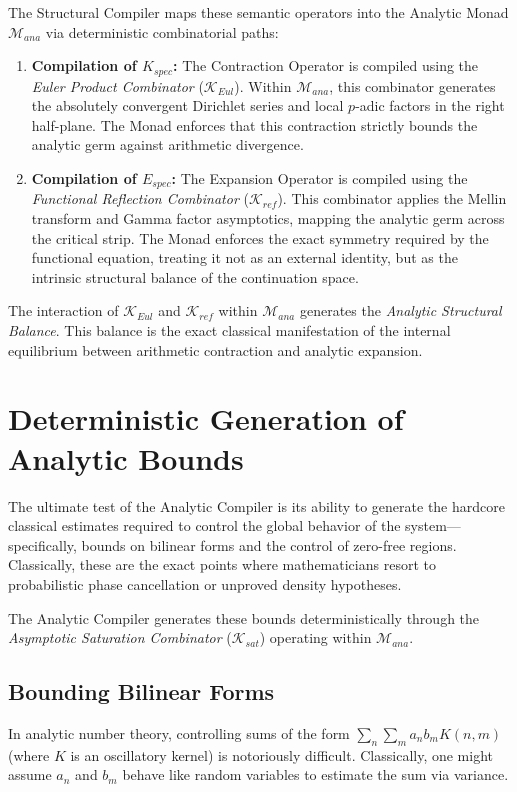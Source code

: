 \documentclass[12pt,openany]{extbook}
\theoremstyle{plain}
\theoremstyle{definition}
\begin{document}
The Structural Compiler maps these semantic operators into the Analytic Monad $\mathcal{M}_{ana}$ via deterministic combinatorial paths:

\begin{enumerate}
    \item \textbf{Compilation of $K_{spec}$:} The Contraction Operator is compiled using the \emph{Euler Product Combinator} ($\mathcal{K}_{Eul}$). Within $\mathcal{M}_{ana}$, this combinator generates the absolutely convergent Dirichlet series and local $p$-adic factors in the right half-plane. The Monad enforces that this contraction strictly bounds the analytic germ against arithmetic divergence.
    \item \textbf{Compilation of $E_{spec}$:} The Expansion Operator is compiled using the \emph{Functional Reflection Combinator} ($\mathcal{K}_{ref}$). This combinator applies the Mellin transform and Gamma factor asymptotics, mapping the analytic germ across the critical strip. The Monad enforces the exact symmetry required by the functional equation, treating it not as an external identity, but as the intrinsic structural balance of the continuation space.
\end{enumerate}

The interaction of $\mathcal{K}_{Eul}$ and $\mathcal{K}_{ref}$ within $\mathcal{M}_{ana}$ generates the \emph{Analytic Structural Balance}. This balance is the exact classical manifestation of the internal equilibrium between arithmetic contraction and analytic expansion.

\section{Deterministic Generation of Analytic Bounds}

The ultimate test of the Analytic Compiler is its ability to generate the hardcore classical estimates required to control the global behavior of the system—specifically, bounds on bilinear forms and the control of zero-free regions. Classically, these are the exact points where mathematicians resort to probabilistic phase cancellation or unproved density hypotheses.

The Analytic Compiler generates these bounds deterministically through the \emph{Asymptotic Saturation Combinator} ($\mathcal{K}_{sat}$) operating within $\mathcal{M}_{ana}$.

\subsection{Bounding Bilinear Forms}
In analytic number theory, controlling sums of the form $\sum_{n} \sum_{m} a_n b_m K(n,m)$ (where $K$ is an oscillatory kernel) is notoriously difficult. Classically, one might assume $a_n$ and $b_m$ behave like random variables to estimate the sum via variance.
\end{document}
